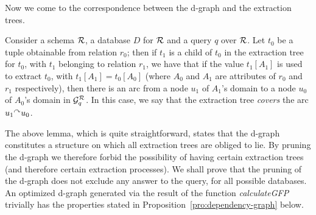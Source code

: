 %  

Now we come to the correspondence between the d-graph and the extraction trees.  


\begin{lemma} \label{lem:graph-vs-extraction}
  Consider a schema $\mathcal{R}$, a database $D$ for $\mathcal{R}$ and a query $q$
  over $\mathcal{R}$.
Let $t_0$ be a tuple
  obtainable from relation $r_0$;
  then if $t_1$ is a child of $t_0$ in the extraction tree for $t_0$, with
  $t_1$ belonging to relation $r_1$, we have that if the value $t_1[A_1]$ is used
  to extract $t_0$, with $t_1[A_1]=t_0[A_0]$ (where $A_0$ and $A_1$ are
  attributes of $r_0$ and $r_1$ respectively), then there is an arc from a node $u_{1}$ of $A_1$'s domain 
  to a node $u_{0}$ of $A_0$'s domain in $\mathcal{G}_q^{\mathcal{R}}$.  In this case, we say that the extraction tree
  \emph{covers} the arc $u_{1}\mbox{$^{\curvearrowright}$} u_{0}$.
\end{lemma}


The above lemma, which is quite straightforward, states that the d-graph constitutes a structure on which all extraction trees are obliged to lie.
 By pruning the d-graph we therefore forbid the possibility of
having certain extraction trees (and therefore certain extraction processes).
We shall prove that the pruning of the d-graph does not exclude any
answer to the query, for all possible databases.
%
%
An optimized d-graph generated via the result of the function
\textit{calculateGFP} trivially has the properties stated in
Proposition~\ref{pro:dependency-graph} below.

